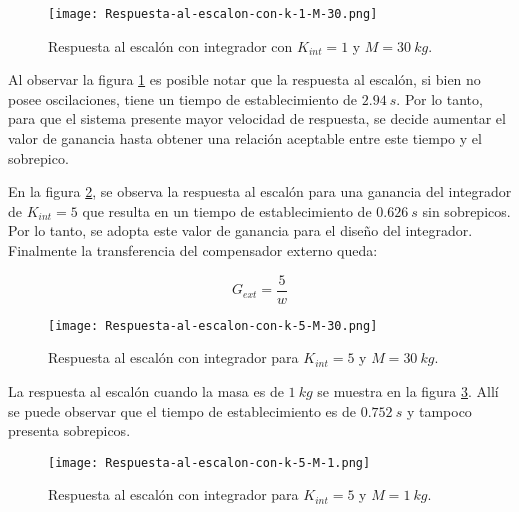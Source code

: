 \begin{figure}[H]
	\centering
	\texttt{[image: Respuesta-al-escalon-con-k-1-M-30.png]}
	\caption{Respuesta al escalón con integrador con $K_{int} =1$ y $M=30\:kg$.}
	\label{fig:respuesta-al-escalon-con-k-1-M-30}
\end{figure}


Al observar la figura \ref{fig:respuesta-al-escalon-con-k-1-M-30} es posible notar que la respuesta al escalón, si bien no posee oscilaciones, tiene un tiempo de establecimiento de  $2.94\:s$. Por lo tanto, para que el sistema presente mayor velocidad de respuesta, se decide aumentar el valor de ganancia hasta obtener una relación aceptable entre este tiempo y el sobrepico.

En la figura \ref{fig:respuesta-al-escalon-con-k-5-M-30}, se observa la respuesta al escalón para una ganancia del integrador de $K_{int}=5$ que resulta en un tiempo de establecimiento de $0.626\:s$ sin sobrepicos. Por lo tanto, se adopta este valor de ganancia para el diseño del integrador. Finalmente la transferencia del compensador externo queda:

\begin{equation} \label{eq_gexterno}
	G_{ext}=\frac{5}{w}	
\end{equation}


\begin{figure}[H]
	\centering
	\texttt{[image: Respuesta-al-escalon-con-k-5-M-30.png]}
	\caption{Respuesta al escalón con integrador para $K_{int} =5$ y $M = 30\:kg$.}
	\label{fig:respuesta-al-escalon-con-k-5-M-30}
\end{figure}






 La respuesta al escal\'{o}n cuando la masa es de $1\:kg$ se muestra en la figura \ref{fig:respuesta-al-escalon-con-k-5-M-1}. Allí se puede observar que el tiempo de establecimiento es de $0.752\:s$ y tampoco presenta sobrepicos.



\begin{figure}[H]
	\centering
	\texttt{[image: Respuesta-al-escalon-con-k-5-M-1.png]}
	\caption{Respuesta al escalón con integrador para $K_{int} =5$ y $M=1\:kg$.}
	\label{fig:respuesta-al-escalon-con-k-5-M-1}
\end{figure}

